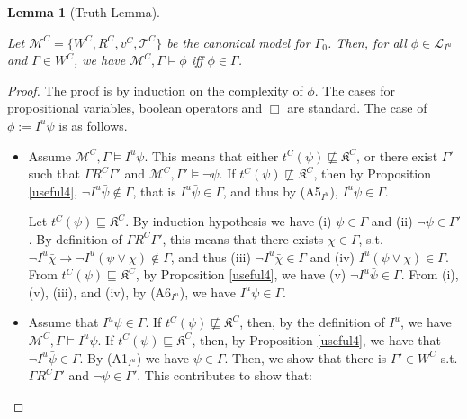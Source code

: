 \documentclass{article}
\newtheorem{lemma}{Lemma}
\begin{document}
\begin{lemma}[Truth Lemma]
\label{TLIU}

Let $\mathcal{M}^{C} = \{W^{C}, R^{C}, v^{C}, \mathcal{T}^{C}\}$ be the canonical model for $\Gamma_{0}$. Then, for all $\phi \in \mathcal{L}_{I^{u}}$ and $\Gamma \in W^{C}$, we have $\mathcal{M}^{C}, \Gamma \models \phi$ iff $\phi \in \Gamma$.

\end{lemma}

\begin{proof}

The proof is by induction on the complexity of $\phi$. The cases for propositional variables, boolean operators and $\Box$ are standard. The case of $\phi:= I^{u} \psi$ is as follows.

\begin{itemize}

\item[($\Rightarrow$)] Assume $\mathcal{M}^{C}, \Gamma \models I^{u} \psi$. This means that either $t^{C}(\psi) \not \sqsubseteq \mathfrak{K}^{C}$, or there exist $\Gamma'$ such that $\Gamma R^{C} \Gamma'$ and $\mathcal{M}^{C}, \Gamma' \models \neg \psi$. If $t^{C}(\psi) \not \sqsubseteq \mathfrak{K}^{C}$, then by Proposition \ref{useful4}, $\neg I^{u} \bar{\psi} \not \in \Gamma$, that is $I^{u} \bar{\psi} \in \Gamma$, and thus by (A5$_{I^{u}}$), $I^{u} \psi \in \Gamma$.

Let $t^{C}(\psi) \sqsubseteq \mathfrak{K}^{C}$. By induction hypothesis we have (i) $\psi \in \Gamma$ and (ii) $\neg \psi \in \Gamma'$. By definition of $\Gamma R^{C} \Gamma'$, this means that there exists $\chi \in \Gamma$, s.t. $\neg I^{u} \bar{\chi} \rightarrow \neg I^{u}(\psi \vee \chi) \not \in \Gamma$, and thus (iii) $\neg I^{u}\bar{\chi} \in \Gamma$ and (iv) $I^{u}(\psi \vee \chi) \in \Gamma$. From $t^{C}(\psi) \sqsubseteq \mathfrak{K}^{C}$, by Proposition \ref{useful4}, we have (v) $\neg I^{u} \bar{\psi} \in \Gamma$. From (i), (v), (iii), and (iv), by (A6$_{I^{u}}$), we have $I^{u} \psi \in \Gamma$.

\item[($\Leftarrow$)] Assume that $I^{u} \psi \in \Gamma$. If $t^{C}(\psi) \not \sqsubseteq \mathfrak{K}^{C}$, then, by the definition of $I^{u}$, we have $\mathcal{M}^{C}, \Gamma \models I^{u} \psi$. If $t^{C}(\psi) \sqsubseteq \mathfrak{K}^{C}$, then, by Proposition \ref{useful4}, we have that $\neg I^{u} \bar{\psi} \in \Gamma$. By (A1$_{I^{u}}$) we have $\psi \in \Gamma$. Then, we show that there is $\Gamma' \in W^{C}$ s.t. $\Gamma R^{C} \Gamma'$ and $\neg \psi \in \Gamma'$. This contributes to show that:




\end{itemize}
\end{proof}
\end{document}
